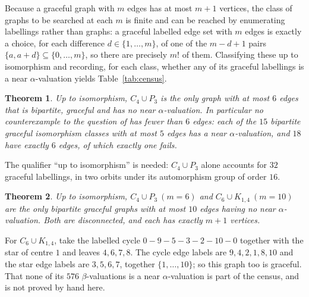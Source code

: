 \documentclass[11pt]{amsart}
\newtheorem{theorem}{Theorem}
\theoremstyle{remark}
\begin{document}
Because a graceful graph with $m$ edges has at most $m+1$ vertices, the class of
graphs to be searched at each $m$ is finite and can be reached by enumerating
labellings rather than graphs: a graceful labelled edge set with $m$ edges is
exactly a choice, for each difference $d\in\{1,\ldots,m\}$, of one of the
$m-d+1$ pairs $\{a,a+d\}\subseteq\{0,\ldots,m\}$, so there are precisely $m!$ of
them. Classifying these up to isomorphism and recording, for each class, whether
any of its graceful labellings is a near $\alpha$-valuation yields
Table~\ref{tab:census}.

\begin{theorem}\label{thm:minimal}
Up to isomorphism, $C_4\cup P_3$ is the only graph with at most $6$ edges that
is bipartite, graceful and has no near $\alpha$-valuation. In particular no
counterexample to the question of \cite{AHM} has fewer than $6$ edges: each of
the $15$ bipartite graceful isomorphism classes with at most $5$ edges has a
near $\alpha$-valuation, and $18$ have exactly $6$ edges, of which exactly one
fails.
\end{theorem}

The qualifier ``up to isomorphism'' is needed: $C_4\cup P_3$ alone accounts for
$32$ graceful labellings, in two orbits under its automorphism group of order
$16$.

\begin{theorem}\label{thm:classification}
Up to isomorphism, $C_4\cup P_3\ (m=6)$ and $C_6\cup K_{1,4}\ (m=10)$ are the
only bipartite graceful graphs with at most $10$ edges having no near
$\alpha$-valuation. Both are disconnected, and each has exactly $m+1$ vertices.
\end{theorem}

For $C_6\cup K_{1,4}$, take the labelled cycle $0-9-5-3-2-10-0$ together with
the star of centre $1$ and leaves $4,6,7,8$. The cycle edge labels are
$9,4,2,1,8,10$ and the star edge labels are $3,5,6,7$, together
$\{1,\ldots,10\}$; so this graph too is graceful. That none of its
$576$ $\beta$-valuations is a near $\alpha$-valuation is part of the census, and
is not proved by hand here.
\end{document}
